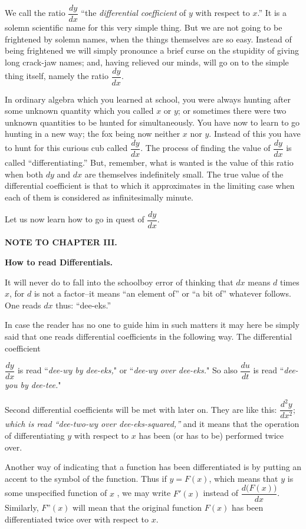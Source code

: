 \documentclass{ximera}
\begin{document}
We call the ratio $\dfrac{dy}{dx}$ “the \textit{differential coefficient} of $y$
with respect to $x$.” It is a solemn scientific name
for this very simple thing. But we are not going
to be frightened by solemn names, when the things
themselves are so easy. Instead of being frightened
we will simply pronounce a brief curse on the
stupidity of giving long crack-jaw names; and, having
relieved our minds, will go on to the simple thing
itself, namely the ratio $\dfrac{dy}{dx}$.


In ordinary algebra which you learned at school,
you were always hunting after some unknown
quantity which you called $x$ or $y$; or sometimes
there were two unknown quantities to be hunted
for simultaneously. You have now to learn to go
hunting in a new way; the fox being now neither
$x$ nor $y$. Instead of this you have to hunt for this
curious cub called $\dfrac{dy}{dx}$. The process of finding the
value of $\dfrac{dy}{dx}$ is called “differentiating.” But, remember,
what is wanted is the value of this ratio when both
$dy$ and $dx$ are themselves indefinitely small. The
true value of the differential coefficient is that to which
it approximates in the limiting case when each of
them is considered as infinitesimally minute.

Let us now learn how to go in quest of $\dfrac{dy}{dx}$.

\begin{center}
\textbf{NOTE TO CHAPTER III.}

\textbf{How to read Differentials.}
\end{center}

It will never do to fall into the schoolboy error of
thinking that $dx$ means $d$ times $x$, for $d$ is not a
factor–it means “an element of” or “a bit of”
whatever follows. One reads $dx$ thus: “dee-eks.”

In case the reader has no one to guide him in such
matters it may here be simply said that one reads
differential coefficients in the following way. The
differential coefficient

$\dfrac{dy}{dx}$
is read ``\textit{dee-wy by dee-eks,}" or ``\textit{dee-wy over dee-eks.}"
 So also
$\dfrac{du}{dt}$ is read ``\textit{dee-you by dee-tee.}"

Second differential coefficients will be met with
later on. They are like this: $\dfrac{d^2 y}{dx^2};$
\textit{which is read “dee-two-wy over dee-eks-squared,”}
and it means that the operation of differentiating $y$
with respect to $x$ has been (or has to be) performed
twice over.

Another way of indicating that a function has been
differentiated is by putting an accent to the symbol of
the function. Thus if $y=F(x)$, which means that $y$
is some unspecified function of $x$ 
, we may
write $F'(x)$ instead of $\dfrac{d\bigl(F(x)\bigr)}{dx}$. Similarly, $F”(x)$
will mean that the original function $F(x)$ has been
differentiated twice over with respect to $x$.
\end{document}

